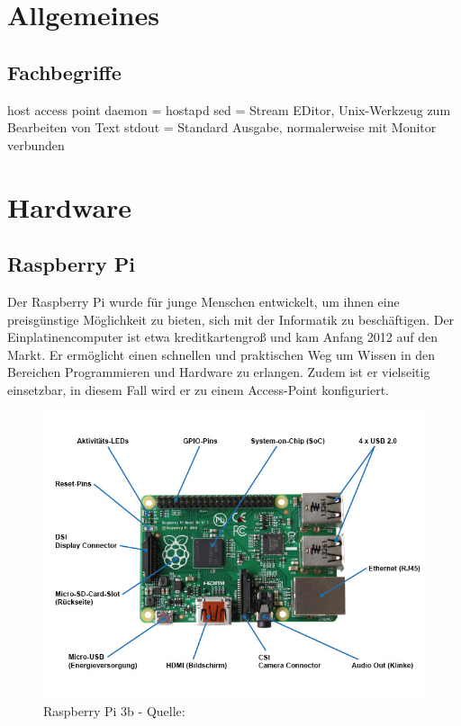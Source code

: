 \documentclass[a4paper,11pt,singlespacing]{article}
\begin{document}
    	\section{Allgemeines}
    	
    	\subsection{Fachbegriffe}
    	host access point daemon = hostapd
    	sed = Stream EDitor, Unix-Werkzeug zum Bearbeiten von Text
    	stdout = Standard Ausgabe, normalerweise mit Monitor verbunden
    	
      	\section{Hardware}
    		\subsection{Raspberry Pi}
    			Der Raspberry Pi wurde für junge Menschen entwickelt, um ihnen eine preisgünstige Möglichkeit zu bieten, sich mit der Informatik zu beschäftigen. Der Einplatinencomputer ist etwa kreditkartengroß und kam Anfang 2012 auf den Markt. Er ermöglicht einen schnellen und praktischen Weg um Wissen in den Bereichen Programmieren und Hardware zu erlangen. Zudem ist er vielseitig einsetzbar, in diesem Fall wird er zu einem Access-Point konfiguriert. 
    			\begin{figure}[H]
    				\centering
	    			\includegraphics[scale=0.5]{raspberry_pi_3b}
	    				\caption{Raspberry Pi 3b - Quelle: \cite{Picture_Raspberrypi3b} }
	    				\label{raspberrypi3b}
				\end{figure}
\end{document}
